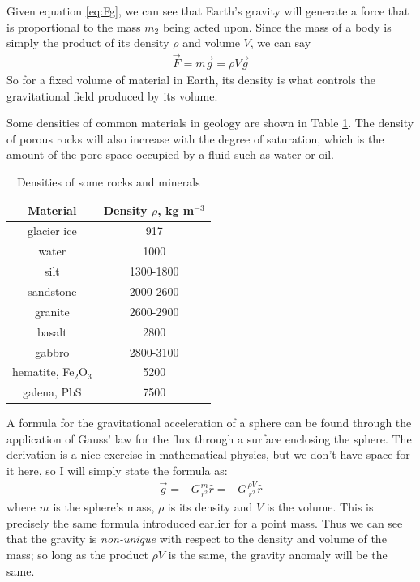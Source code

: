 \documentclass[11pt, oneside]{article}   	%
\begin{document}
Given equation \ref{eq:Fg}, we can see that Earth's gravity will generate a force that is proportional to the mass $m_2$ being acted upon.  Since the mass of a body is simply the product of its density $\rho$ and volume $V$, we can say
\begin{eqnarray}
	 \overrightarrow{F}= m  \overrightarrow{g} = \rho V \overrightarrow{g} 
\end{eqnarray}
So for a fixed volume of material in Earth, its density is what controls the gravitational field produced by its volume.

Some densities of common materials in geology are shown in Table \ref{table:Densities}. The density of porous rocks will also increase with the degree of saturation, which is the amount of the pore space occupied by a fluid such as water or oil.

\begin{table}[htbp]
\caption{Densities of some rocks and minerals}
\begin{center}
\begin{tabular}{|c|c|}
\hline 
Material & Density $\rho$, kg m$^{-3}$ \\
\hline 
glacier ice &  917	\\
water & 1000 \\
silt & 1300-1800 \\
sandstone &  2000-2600\\
granite & 2600-2900 \\
basalt & 2800  \\
gabbro & 2800-3100\\ 
hematite, Fe$_2$O$_3$ & 5200\\
galena, PbS & 7500 \\
\hline 
\end{tabular}
\end{center}
\label{table:Densities}
\end{table}%

A formula for the gravitational acceleration of a sphere can be found through the application of Gauss' law for the flux through a  surface enclosing the sphere. The derivation  is a nice exercise in mathematical physics, but we don't have space for it here, so I will simply state the formula as:
\begin{eqnarray}
	 \overrightarrow{g}=-G{\frac {m }{r^{2}}} \hat r  =  -G{\frac {\rho V }{r^{2}}} \hat r 
\end{eqnarray}
where $m$ is the sphere's mass, $\rho$ is its density and $V$ is the volume.  This is precisely the same formula introduced earlier for a point mass. Thus we can see that the gravity  is {\it non-unique} with respect to the density and volume of the mass; so long as the product $\rho V$ is the same, the gravity anomaly will be the same.  
\end{document}
